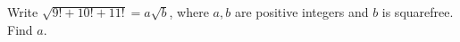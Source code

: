 Write $\sqrt{9!+10!+11!}=a\sqrt b$, where $a,b$ are positive integers and $b$ is squarefree. Find $a$.
